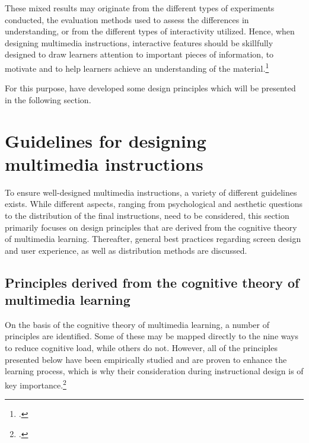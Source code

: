 These mixed results may originate from the different types of experiments conducted, the evaluation methods used to assess the differences in understanding, or from the different types of interactivity utilized. Hence, when designing multimedia instructions, interactive features should be skillfully designed to draw learners attention to important pieces of information, to motivate and to help learners achieve an understanding of the material.\footcites[Cf.][p.21]{KirshInteractivitymultimediainterfaces1997}[cf.][p.15]{LeeScreenDesignGuidelines1999}

For this purpose, \cite{MorenoInteractiveMultimodalLearning2007} have developed some design principles which will be presented in the following section.

\section{Guidelines for designing multimedia instructions} \label{sec:GuidelinesMultimediaInstr}
To ensure well-designed multimedia instructions, a variety of different guidelines exists. While different aspects, ranging from psychological and aesthetic questions to the distribution of the final instructions, need to be considered, this section primarily focuses on design principles that are derived from the cognitive theory of multimedia learning. Thereafter, general best practices regarding screen design and user experience, as well as distribution methods are discussed.

\subsection{Principles derived from the cognitive theory of multimedia learning}
On the basis of the cognitive theory of multimedia learning, a number of principles are identified. Some of these may be mapped directly to the nine ways to reduce cognitive load, while others do not. However, all of the principles presented below have been empirically studied and are proven to enhance the learning process, which is why their consideration during instructional design is of key importance.\footcites[Cf. for more detail][]{SordenCognitiveTheoryMultimedia2012}

